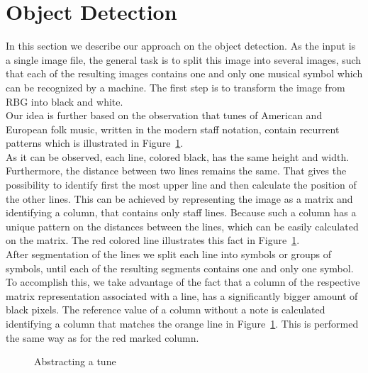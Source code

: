 \documentclass[twocolumn]{article}
\begin{document}
\section{Object Detection}
In this section we describe our approach on the object detection. As the input is a single image file, the general task is to split this image into several images, such that each of the resulting images contains one and only one musical symbol which can be recognized by a machine. The first step is to transform the image from RBG into black and white. \\
Our idea is further based on the observation that tunes of American and European folk music, written in the modern staff notation, contain recurrent patterns which is illustrated in Figure~\ref{object_detection}. \\
As it can be observed, each line, colored black, has the same height and width. Furthermore, the distance between two lines remains the same. That gives the possibility to identify first the most upper line and then calculate the position of the other lines. This can be achieved by representing the image as a matrix and identifying a column, that contains only staff lines. Because such a column has a unique pattern on the distances between the lines, which can be easily calculated on the matrix. The red colored line illustrates this fact in Figure~\ref{object_detection}. \\
After segmentation of the lines we split each line into symbols or groups of symbols, until each of the resulting segments contains one and only one symbol. To accomplish this, we take advantage of the fact that a column of the respective matrix representation associated with a line, has a significantly bigger amount of black pixels. The reference value of a column without a note is calculated identifying a column that matches the orange line in  Figure~\ref{object_detection}. This is performed the same way as for the red marked column. 

\begin{figure}
 
 \caption{Abstracting a tune} 
 \label{object_detection}
\end{figure}
\end{document}
